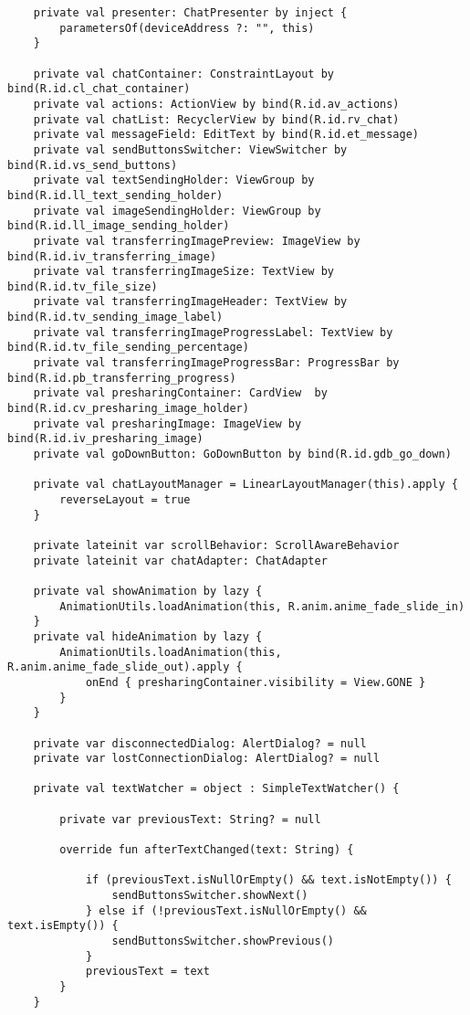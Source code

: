 \begin{lstlisting}
    private val presenter: ChatPresenter by inject {
        parametersOf(deviceAddress ?: "", this)
    }

    private val chatContainer: ConstraintLayout by bind(R.id.cl_chat_container)
    private val actions: ActionView by bind(R.id.av_actions)
    private val chatList: RecyclerView by bind(R.id.rv_chat)
    private val messageField: EditText by bind(R.id.et_message)
    private val sendButtonsSwitcher: ViewSwitcher by bind(R.id.vs_send_buttons)
    private val textSendingHolder: ViewGroup by bind(R.id.ll_text_sending_holder)
    private val imageSendingHolder: ViewGroup by bind(R.id.ll_image_sending_holder)
    private val transferringImagePreview: ImageView by bind(R.id.iv_transferring_image)
    private val transferringImageSize: TextView by bind(R.id.tv_file_size)
    private val transferringImageHeader: TextView by bind(R.id.tv_sending_image_label)
    private val transferringImageProgressLabel: TextView by bind(R.id.tv_file_sending_percentage)
    private val transferringImageProgressBar: ProgressBar by bind(R.id.pb_transferring_progress)
    private val presharingContainer: CardView  by bind(R.id.cv_presharing_image_holder)
    private val presharingImage: ImageView by bind(R.id.iv_presharing_image)
    private val goDownButton: GoDownButton by bind(R.id.gdb_go_down)

    private val chatLayoutManager = LinearLayoutManager(this).apply {
        reverseLayout = true
    }

    private lateinit var scrollBehavior: ScrollAwareBehavior
    private lateinit var chatAdapter: ChatAdapter

    private val showAnimation by lazy {
        AnimationUtils.loadAnimation(this, R.anim.anime_fade_slide_in)
    }
    private val hideAnimation by lazy {
        AnimationUtils.loadAnimation(this, R.anim.anime_fade_slide_out).apply {
            onEnd { presharingContainer.visibility = View.GONE }
        }
    }

    private var disconnectedDialog: AlertDialog? = null
    private var lostConnectionDialog: AlertDialog? = null

    private val textWatcher = object : SimpleTextWatcher() {

        private var previousText: String? = null

        override fun afterTextChanged(text: String) {

            if (previousText.isNullOrEmpty() && text.isNotEmpty()) {
                sendButtonsSwitcher.showNext()
            } else if (!previousText.isNullOrEmpty() && text.isEmpty()) {
                sendButtonsSwitcher.showPrevious()
            }
            previousText = text
        }
    }


\end{lstlisting}
